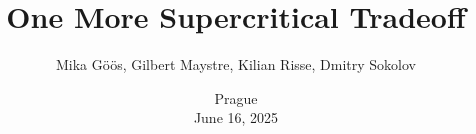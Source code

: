 

\titlegraphic{
    
}


\title[]{
    One More Supercritical Tradeoff
}

\author{
    Mika G{\"{o}}{\"{o}}s,
    Gilbert Maystre,
    Kilian Risse,
    Dmitry Sokolov
}  


\date{
    Prague\\
    June 16, 2025
}






    \maketitle
    
    
    
    
    
    

